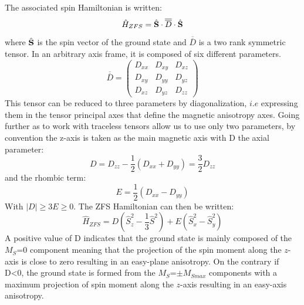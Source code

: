 \documentclass[10pt]{report}
\numberwithin{equation}{section}
\begin{document}
The associated spin Hamiltonian is written:
\begin{equation}\label{SDS}
    \hat{H}_{ZFS}=\hat{\vb S} \cdot \overline{\overline{D}} \cdot \hat{\vb S}
\end{equation}
where $\hat{\vb S}$ is the spin vector of the ground state and $\overline{\overline{D}}$ is a two rank symmetric tensor. In an arbitrary axis frame, it is composed of six different parameters.
\begin{equation}
    \overline{\overline{D}}=\begin{pmatrix}
        D_{xx} & D_{xy} & D_{xz}\\
        D_{xy} & D_{yy} & D_{yz}\\
        D_{xz} & D_{yz} & D_{zz}
    \end{pmatrix}
\end{equation}
This tensor can be reduced to three parameters by diagonalization, $\textit{i.e}$ expressing them in the tensor principal axes that define the magnetic anisotropy axes.
Going further as to work with traceless tensors allow us to use only two parameters, by convention the z-axis is taken as the main magnetic axis with D the axial parameter:
\begin{equation}\label{ParametreD}
    D=D_{zz}-\frac{1}{2}(D_{xx}+D_{yy})=\frac{3}{2}D_{zz}
\end{equation}
and the rhombic term:
\begin{equation}\label{ParametreE}
    E=\frac{1}{2}(D_{xx}-D_{yy})
\end{equation}
With $|D| \geq 3E \geq 0$. 
The ZFS Hamiltonian can then be written:
\begin{equation}\label{HZFS}
    \hat{H}_{ZFS}=D (\hat{S}_z^2-\frac{1}{3}\hat{S}^2)+E(\hat{S}_x^2-\hat{S}_y^2)
\end{equation}
A positive value of D indicates that the ground state is mainly composed of the $M_S$=0 component meaning that the projection of the spin moment along the $z$-axis is close to zero resulting in an easy-plane anisotropy. 
On the contrary if D<0, the ground state is formed from the $M_S$=$\pm M_{Smax}$ components with a maximum projection of spin moment along the $z$-axis resulting in an easy-axis anisotropy.
\end{document}
